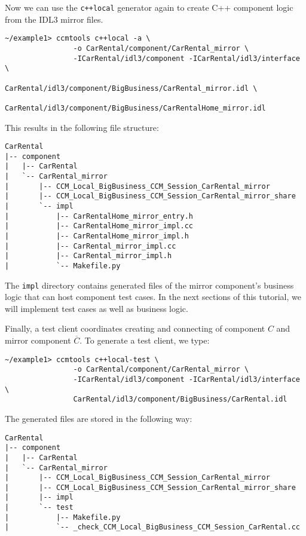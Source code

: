 Now we can use the {\tt c++local} generator again to create C++ component logic 
from the IDL3 mirror files.
\begin{small}
\begin{verbatim}
~/example1> ccmtools c++local -a \
                -o CarRental/component/CarRental_mirror \
                -ICarRental/idl3/component -ICarRental/idl3/interface \
                CarRental/idl3/component/BigBusiness/CarRental_mirror.idl \
                CarRental/idl3/component/BigBusiness/CarRentalHome_mirror.idl
\end{verbatim}
\end{small}
This results in the following file structure:
\begin{small}
\begin{verbatim}
CarRental 
|-- component
|   |-- CarRental
|   `-- CarRental_mirror
|       |-- CCM_Local_BigBusiness_CCM_Session_CarRental_mirror
|       |-- CCM_Local_BigBusiness_CCM_Session_CarRental_mirror_share
|       `-- impl
|           |-- CarRentalHome_mirror_entry.h
|           |-- CarRentalHome_mirror_impl.cc
|           |-- CarRentalHome_mirror_impl.h
|           |-- CarRental_mirror_impl.cc
|           |-- CarRental_mirror_impl.h
|           `-- Makefile.py
\end{verbatim}
\end{small}

The {\tt impl} directory contains generated files of the mirror
component's business logic that can host component test cases.
In the next sections of this tutorial, we will implement test cases as well
as business logic. 

\newpage
Finally, a test client coordinates creating and connecting of component $C$ and 
mirror component $\overline{C}$.
To generate a test client, we type:
\begin{small}
\begin{verbatim}
~/example1> ccmtools c++local-test \
                -o CarRental/component/CarRental_mirror \
                -ICarRental/idl3/component -ICarRental/idl3/interface \
                CarRental/idl3/component/BigBusiness/CarRental.idl
\end{verbatim}
\end{small}

The generated files are stored in the following way:
\begin{small}
\begin{verbatim}
CarRental
|-- component
|   |-- CarRental
|   `-- CarRental_mirror
|       |-- CCM_Local_BigBusiness_CCM_Session_CarRental_mirror
|       |-- CCM_Local_BigBusiness_CCM_Session_CarRental_mirror_share
|       |-- impl
|       `-- test
|           |-- Makefile.py
|           `-- _check_CCM_Local_BigBusiness_CCM_Session_CarRental.cc
\end{verbatim}
\end{small}

